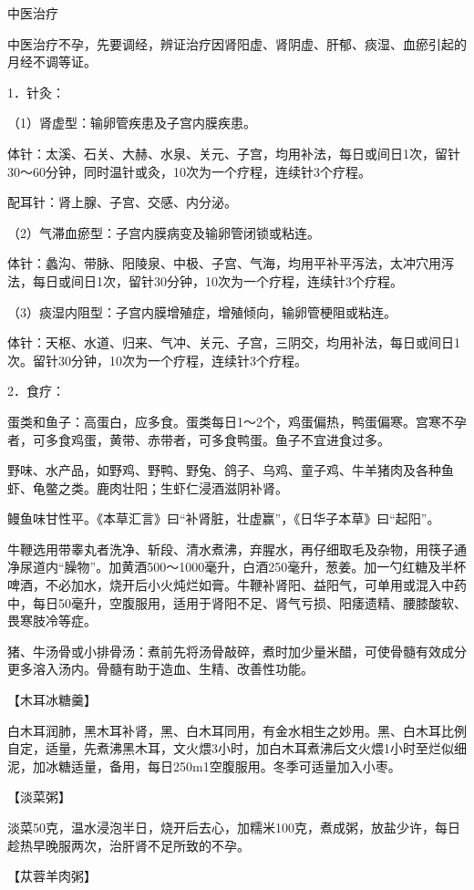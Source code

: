 \documentclass[12pt,UTF8]{ctexbook}
\begin{document}
中医治疗

中医治疗不孕，先要调经，辨证治疗因肾阳虚、肾阴虚、肝郁、痰湿、血瘀引起的月经不调等证。

1．针灸：

（1）肾虚型：输卵管疾患及子宫内膜疾患。

体针：太溪、石关、大赫、水泉、关元、子宫，均用补法，每日或间日1次，留针30～60分钟，同时温针或灸，10次为一个疗程，连续针3个疗程。

配耳针：肾上腺、子宫、交感、内分泌。

（2）气滞血瘀型：子宫内膜病变及输卵管闭锁或粘连。

体针：蠡沟、带脉、阳陵泉、中极、子宫、气海，均用平补平泻法，太冲穴用泻法，每日或间日1次，留针30分钟，10次为一个疗程，连续针3个疗程。

（3）痰湿内阻型：子宫内膜增殖症，增殖倾向，输卵管梗阻或粘连。

体针：天枢、水道、归来、气冲、关元、子宫，三阴交，均用补法，每日或间日1次。留针30分钟，10次为一个疗程，连续针3个疗程。

2．食疗：

蛋类和鱼子：高蛋白，应多食。蛋类每日1～2个，鸡蛋偏热，鸭蛋偏寒。宫寒不孕者，可多食鸡蛋，黄带、赤带者，可多食鸭蛋。鱼子不宜进食过多。

野味、水产品，如野鸡、野鸭、野兔、鸽子、乌鸡、童子鸡、牛羊猪肉及各种鱼虾、龟鳖之类。鹿肉壮阳；生虾仁浸酒滋阴补肾。

鳗鱼味甘性平。《本草汇言》曰“补肾脏，壮虚赢”，《日华子本草》曰“起阳”。

牛鞭选用带睾丸者洗净、斩段、清水煮沸，弃腥水，再仔细取毛及杂物，用筷子通净尿道内“臊物”。加黄酒500～1000毫升，白酒250毫升，葱姜。加一勺红糖及半杯啤酒，不必加水，烧开后小火炖烂如膏。牛鞭补肾阳、益阳气，可单用或混入中药中，每日50毫升，空腹服用，适用于肾阳不足、肾气亏损、阳痿遗精、腰膝酸软、畏寒肢冷等症。

猪、牛汤骨或小排骨汤：煮前先将汤骨敲碎，煮时加少量米醋，可使骨髓有效成分更多溶入汤内。骨髓有助于造血、生精、改善性功能。

【木耳冰糖羹】

白木耳润肺，黑木耳补肾，黑、白木耳同用，有金水相生之妙用。黑、白木耳比例自定，适量，先煮沸黑木耳，文火煨3小时，加白木耳煮沸后文火煨1小时至烂似细泥，加冰糖适量，备用，每日250m1空腹服用。冬季可适量加入小枣。

【淡菜粥】

淡菜50克，温水浸泡半日，烧开后去心，加糯米100克，煮成粥，放盐少许，每日趁热早晚服两次，治肝肾不足所致的不孕。

【苁蓉羊肉粥】
\end{document}
